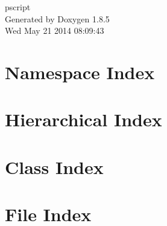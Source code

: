 \documentclass[twoside]{book}
\newcommand{\clearemptydoublepage}{%
  \newpage{\pagestyle{empty}\cleardoublepage}%
}
\begin{document}
\hypersetup{pageanchor=false}
\begin{titlepage}
\vspace*{7cm}
\begin{center}%
{\Large pscript }\\
\vspace*{1cm}
{\large Generated by Doxygen 1.8.5}\\
\vspace*{0.5cm}
{\small Wed May 21 2014 08:09:43}\\
\end{center}
\end{titlepage}
\clearemptydoublepage
\tableofcontents
\clearemptydoublepage
{}
\hypersetup{pageanchor=true}

\chapter{Namespace Index}

\chapter{Hierarchical Index}

\chapter{Class Index}

\chapter{File Index}

\end{document}
